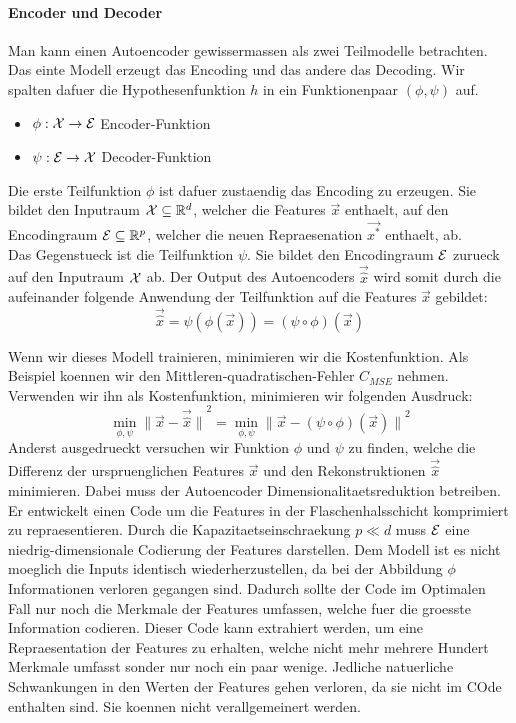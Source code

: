 \paragraph{Encoder und Decoder}
Man kann einen Autoencoder gewissermassen als zwei Teilmodelle betrachten. Das
einte Modell erzeugt das Encoding und das andere das Decoding. Wir spalten
dafuer die Hypothesenfunktion $h$ in ein Funktionenpaar $(\phi,\psi)$ auf.
\begin{itemize}
\item{$\phi: \mathcal{X} \to \mathcal{E}$ Encoder-Funktion}
\item{$\psi: \mathcal{E} \to \mathcal{X}$ Decoder-Funktion}
\end{itemize}
Die erste Teilfunktion $\phi$ ist dafuer zustaendig das Encoding zu erzeugen. Sie
bildet den Inputraum $\mathcal{X} \subseteq \mathbb{R}^d$, welcher die Features $\vec{x}$ enthaelt, auf
den Encodingraum $\mathcal{E} \subseteq \mathbb{R}^p$, welcher die neuen
Repraesenation $\vec{x^*}$ enthaelt, ab. \\
Das Gegenstueck ist die Teilfunktion $\psi$. Sie bildet den Encodingraum
$\mathcal{E}$ zurueck auf den Inputraum $\mathcal{X}$ ab.
\para{}
Der Output des Autoencoders $\vec{\hat{x}}$ wird somit durch die aufeinander
folgende Anwendung der Teilfunktion auf die Features $\vec{x}$ gebildet:
\begin{equation}
  \vec{\hat{x}} = \psi(\phi(\vec{x})) = (\psi \circ \phi)(\vec{x})
\end{equation}

Wenn wir dieses Modell trainieren, minimieren wir die Kostenfunktion. Als
Beispiel koennen wir den Mittleren-quadratischen-Fehler $C_{MSE}$ nehmen.
Verwenden wir ihn als Kostenfunktion, minimieren wir folgenden Ausdruck:
\begin{equation}
  \min_{\phi,\psi} {\|\vec{x} - \vec{\hat{x}}\|}^2 = \min_{\phi,\psi} {\|\vec{x} - (\psi \circ \phi)(\vec{x})\|}^2
\end{equation}
Anderst ausgedrueckt versuchen wir Funktion $\phi$ und $\psi$ zu finden, welche
die Differenz der urspruenglichen Features $\vec{x}$ und den Rekonstruktionen
$\vec{\hat{x}}$ minimieren. Dabei muss der Autoencoder
Dimensionalitaetsreduktion betreiben. Er entwickelt einen Code um die Features
in der Flaschenhalsschicht komprimiert zu repraesentieren. Durch die
Kapazitaetseinschraekung $p \ll d$ muss $\mathcal{E}$ eine niedrig-dimensionale
Codierung der Features darstellen. Dem Modell ist es nicht moeglich die Inputs
identisch wiederherzustellen, da bei der Abbildung $\phi$ Informationen verloren
gegangen sind. Dadurch sollte der Code im Optimalen Fall nur noch die Merkmale
der Features umfassen, welche fuer die groesste Information codieren.
Dieser Code kann extrahiert werden, um eine Repraesentation der Features zu
erhalten, welche nicht mehr mehrere Hundert Merkmale umfasst sonder nur noch ein
paar wenige. Jedliche natuerliche Schwankungen in den Werten der Features gehen
verloren, da sie nicht im COde enthalten sind. Sie koennen nicht verallgemeinert werden.

